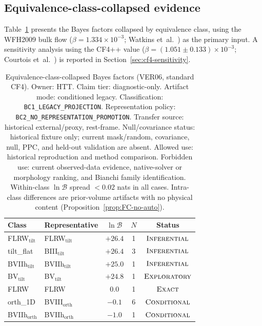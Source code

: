 \subsection{Equivalence-class-collapsed evidence}
\label{sec:class-collapsed}

Table~\ref{tab:class-collapsed} presents the Bayes factors
collapsed by equivalence class, using the WFH2009 bulk flow
($\beta = 1.334 \times 10^{-3}$;
Watkins et~al.~\cite{Watkins2023}) as the primary input.
A sensitivity analysis using the CF4++ value
($\beta = (1.051 \pm 0.133) \times 10^{-3}$;
Courtois et~al.~\cite{Courtois2025}) is reported in
Section~\ref{sec:cf4-sensitivity}.

\begin{table}[t]
\caption{Equivalence-class-collapsed Bayes factors (VER06, standard CF4).
  Owner: HTT.  Claim tier: diagnostic-only.  Artifact mode: conditioned
  legacy.  Classification: \texttt{BC1\_LEGACY\_PROJECTION}.
  Representation policy:
  \texttt{BC2\_NO\_REPRESENTATION\_PROMOTION}.  Transfer source:
  historical external/proxy, rest-frame.
  Null/covariance status: historical fixture only; current mask/random,
  covariance, null, PPC, and held-out validation are absent.  Allowed use:
  historical reproduction and method comparison.  Forbidden use: current
  observed-data evidence, native-solver or morphology ranking, and Bianchi
  family identification.  Within-class $\ln\mathcal{B}$ spread $< 0.02$
  nats in all cases.  Intra-class differences are prior-volume artifacts
  with no physical content (Proposition~\ref{prop:FC-no-auto}).}
\label{tab:class-collapsed}
\centering\footnotesize
\setlength{\tabcolsep}{3pt}
\begin{tabular}{llccc}
\hline\hline
Class & Representative & $\ln\mathcal{B}$ & $N$ & Status \\
\hline
FLRW$_{\mathrm{tilt}}$ & FLRW$_{\mathrm{tilt}}$ &
  $+26.4$ & 1 & $\textsc{Inferential}$ \\
tilt\_flat & BIII$_{\mathrm{tilt}}$ &
  $+26.4$ & 3 & $\textsc{Inferential}$ \\
BVIIh$_{\mathrm{tilt}}$ & BVIIh$_{\mathrm{tilt}}$ &
  $+25.0$ & 1 & $\textsc{Inferential}$ \\
BV$_{\mathrm{tilt}}$ & BV$_{\mathrm{tilt}}$ &
  $+24.8$ & 1 & $\textsc{Exploratory}$ \\
FLRW & FLRW & $0.0$ & 1 & $\textsc{Exact}$ \\
orth\_1D & BVIII$_{\mathrm{orth}}$ &
  $-0.1$ & 6 & $\textsc{Conditional}$ \\
BVIIh$_{\mathrm{orth}}$ & BVIIh$_{\mathrm{orth}}$ &
  $-1.0$ & 1 & $\textsc{Conditional}$ \\
\hline\hline
\end{tabular}
\end{table}


